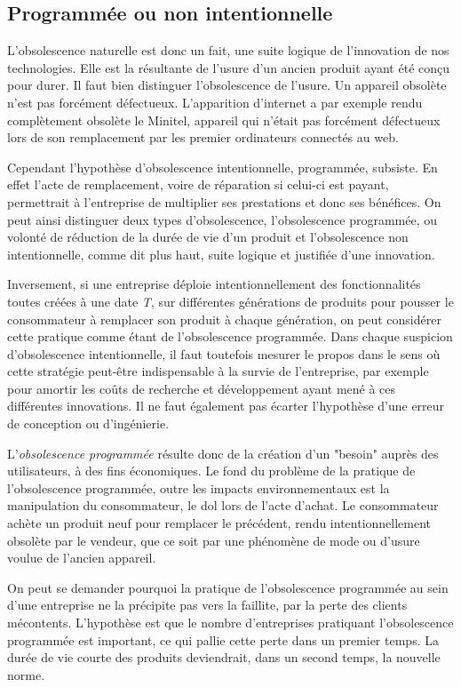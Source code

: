 \subsection{Programmée ou non intentionnelle}

L'obsolescence naturelle est donc un fait, une suite logique de l'innovation de nos technologies. Elle est la résultante de l'usure d'un ancien produit ayant été conçu pour durer.
Il faut bien distinguer l’obsolescence de l’usure. Un appareil obsolète n’est pas forcément défectueux. L’apparition d’internet a par exemple rendu complètement obsolète le Minitel, appareil qui n'était pas forcément défectueux lors de son remplacement par les premier ordinateurs connectés au web. 

\bigbreak
Cependant l'hypothèse d'obsolescence intentionnelle, programmée, subsiste. 
En effet l'acte de remplacement, voire de réparation si celui-ci est payant, permettrait à l'entreprise de multiplier ses prestations et donc ses bénéfices. 
On peut ainsi distinguer deux types d'obsolescence, l'obsolescence programmée, ou volonté de réduction de la durée de vie d’un produit et l'obsolescence non intentionnelle, comme dit plus haut, suite logique et justifiée d’une innovation.

\bigbreak
Inversement, si une entreprise déploie intentionnellement des fonctionnalités toutes créées à une date \textit{T}, sur différentes générations de produits pour pousser le consommateur à remplacer son produit à chaque génération, on peut considérer cette pratique comme étant de l'obsolescence programmée. Dans chaque suspicion d’obsolescence intentionnelle, il faut toutefois mesurer le propos dans le sens où cette stratégie peut-être indispensable à la survie de l’entreprise, par exemple pour amortir les coûts de recherche et développement ayant mené à ces différentes innovations. Il ne faut également pas écarter l’hypothèse d’une erreur de conception ou d'ingénierie.

\medbreak
L'\textit{obsolescence programmée} résulte donc de la création d'un "besoin" auprès des utilisateurs, à des fins économiques. Le fond du problème de la pratique de l'obsolescence programmée, outre les impacts environnementaux est la manipulation du consommateur, le dol lors de l'acte d'achat. Le consommateur achète un produit neuf pour remplacer le précédent, rendu intentionnellement obsolète par le vendeur, que ce soit par une phénomène de mode ou d'usure voulue de l’ancien appareil.

\bigbreak
On peut se demander pourquoi la pratique de l’obsolescence programmée au sein d’une entreprise ne la précipite pas vers la faillite, par la perte des clients mécontents. L’hypothèse est que le nombre d’entreprises pratiquant l’obsolescence programmée est important, ce qui pallie cette perte dans un premier temps. La durée de vie courte des produits deviendrait, dans un second temps, la nouvelle norme.
